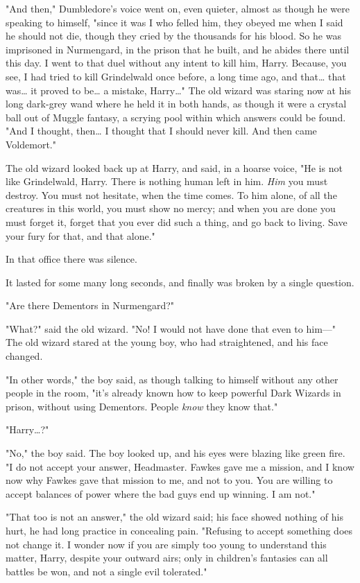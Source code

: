 "And then," Dumbledore's voice went on, even quieter, almost as though he were 
speaking to himself, "since it was I who felled him, they obeyed me when I said 
he should not die, though they cried by the thousands for his blood. So he was 
imprisoned in Nurmengard, in the prison that he built, and he abides there 
until this day. I went to that duel without any intent to kill him, Harry. 
Because, you see, I had tried to kill Grindelwald once before, a long time ago, 
and that{\ldots} that was{\ldots} it proved to be{\ldots} a mistake, 
Harry{\ldots}" The old wizard was staring now at his long dark-grey wand where 
he held it in both hands, as though it were a crystal ball out of Muggle 
fantasy, a scrying pool within which answers could be found. "And I thought, 
then{\ldots} I thought that I should never kill. And then came Voldemort."

The old wizard looked back up at Harry, and said, in a hoarse voice, "He is not 
like Grindelwald, Harry. There is nothing human left in him. \emph{Him} you 
must destroy. You must not hesitate, when the time comes. To him alone, of all 
the creatures in this world, you must show no mercy; and when you are done you 
must forget it, forget that you ever did such a thing, and go back to living. 
Save your fury for that, and that alone."

In that office there was silence.

It lasted for some many long seconds, and finally was broken by a single 
question.

"Are there Dementors in Nurmengard?"

"What?" said the old wizard. "No! I would not have done that even to him---"
\sbreak
The old wizard stared at the young boy, who had straightened, and his face 
changed.

"In other words," the boy said, as though talking to himself without any other 
people in the room, "it's already known how to keep powerful Dark Wizards in 
prison, without using Dementors. People \emph{know} they know that."

"Harry{\ldots}?"

"No," the boy said. The boy looked up, and his eyes were blazing like green 
fire. "I do not accept your answer, Headmaster. Fawkes gave me a mission, and I 
know now why Fawkes gave that mission to me, and not to you. You are willing to 
accept balances of power where the bad guys end up winning. I am not."

"That too is not an answer," the old wizard said; his face showed nothing of 
his hurt, he had long practice in concealing pain. "Refusing to accept 
something does not change it. I wonder now if you are simply too young to 
understand this matter, Harry, despite your outward airs; only in children's 
fantasies can all battles be won, and not a single evil tolerated."

